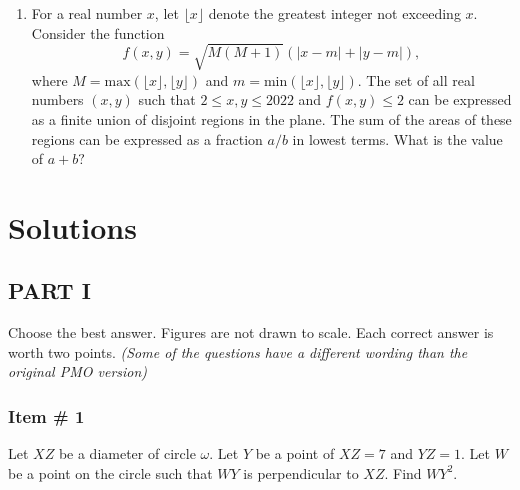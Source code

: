 \documentclass[11pt,paper=letter]{scrartcl}
\begin{document}
\begin{enumerate}[resume, label=\arabic*.,font=\bfseries]
    \newpage
    
    \item For a real number $x$, let $\lfloor x \rfloor$ denote the greatest integer not exceeding $x$. Consider the function $$f(x,y) = \sqrt{M(M+1)}\left(|x-m|+|y-m|\right),$$ where $M = \text{max} (\lfloor x \rfloor, \lfloor y \rfloor)$ and $m = \text{min} (\lfloor x \rfloor, \lfloor y \rfloor)$. The set of all real numbers $(x,y)$ such that $2 \leq x, y \leq 2022$ and $f(x,y) \leq 2$ can be expressed as a finite union of disjoint regions in the plane. The sum of the areas of these regions can be expressed as a fraction $a/b$ in lowest terms. What is the value of $a+b?$
    
    
\end{enumerate}

\newpage

\section{Solutions}

\subsection{PART I}

Choose the best answer. Figures are not drawn to scale. Each correct answer is worth two points. \textit{(Some of the questions have a different wording than the original PMO version)}

\vspace{2mm}

\subsubsection{Item \# 1}

\begin{probboxed}
 Let $XZ$ be a diameter of circle $\omega$. Let $Y$ be a point of $XZ=7$ and $YZ=1.$ Let $W$ be a point on the circle such that $WY$ is perpendicular to $XZ$. Find $WY^2$.
    
\end{probboxed}


\sol
\end{document}
